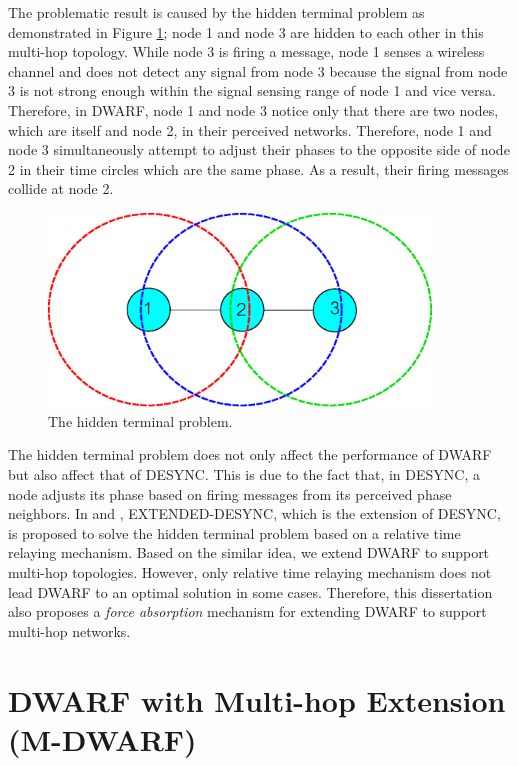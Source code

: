 The problematic result is caused by the hidden terminal problem as demonstrated in Figure \ref{fig:3nodes-chain-hidden}; node 1 and node 3 are hidden to each other in this multi-hop topology. While node 3 is firing a message, node 1 senses a wireless channel and does not detect any signal from node 3 because the signal from node 3 is not strong enough within the signal sensing range of node 1 and vice versa. Therefore, in DWARF, node 1 and node 3 notice only that there are two nodes, which are itself and node 2, in their perceived networks. Therefore, node 1 and node 3 simultaneously attempt to adjust their phases to the opposite side of node 2 in their time circles which are the same phase. As a result, their firing messages collide at node 2. 

\begin{figure}[!t]
\centering
\includegraphics[width=4in]{figure/3nodes-chain-hidden}
\caption{The hidden terminal problem.}
\label{fig:3nodes-chain-hidden}
\end{figure}

The hidden terminal problem does not only affect the performance of DWARF but also affect that of DESYNC.
This is due to the fact that, in DESYNC, a node adjusts its phase based on firing messages from its perceived phase neighbors. In \cite{4663417} and \cite{MK09DESYNC}, EXTENDED-DESYNC, which is the extension of DESYNC, is proposed to solve the hidden terminal problem based on a relative time relaying mechanism. Based on the similar idea, we extend DWARF to support multi-hop topologies.
However, only relative time relaying mechanism does not lead DWARF to an optimal solution in some cases. Therefore, this dissertation also proposes a \textit{force absorption} mechanism for extending DWARF to support multi-hop networks.   

\section{DWARF with Multi-hop Extension (M-DWARF)}
\label{sec:extension}
